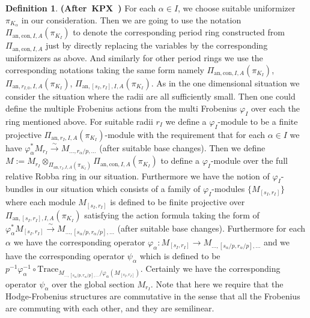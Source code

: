 \documentclass[12pt]{amsart}
\theoremstyle{definition}
\newtheorem{definition}[theorem]{Definition}
\numberwithin{equation}{section}
\begin{document}
\begin{definition} \mbox{\bf{(After KPX \cite[Definition 2.2.2]{KPX})}}
For each $\alpha\in I$, we choose suitable uniformizer $\pi_{K_\alpha}$ in our consideration. Then we are going to use the notation $\Pi_{\mathrm{an},\mathrm{con},I,A}(\pi_{K_I})$ to denote the corresponding period ring constructed from $\Pi_{\mathrm{an},\mathrm{con},I,A}$ just by directly replacing the variables by the corresponding uniformizers as above. And similarly for other period rings we use the corresponding notations taking the same form namely $\Pi_{\mathrm{an},\mathrm{con},I,A}(\pi_{K_I})$, $\Pi_{\mathrm{an},r_{I,0},I,A}(\pi_{K_I})$, $\Pi_{\mathrm{an},[s_I,r_I],I,A}(\pi_{K_I})$. As in the one dimensional situation we consider the situation where the radii are all sufficiently small. Then one could define the multiple Frobenius actions from the multi Frobenius $\varphi_I$ over each the ring mentioned above. For suitable radii $r_I$ we define a $\varphi_I$-module to be a finite projective $\Pi_{\mathrm{an},r_{I},I,A}(\pi_{K_I})$-module with the requirement that for each $\alpha\in I$ we have $\varphi_\alpha^*M_{r_I}\overset{\sim}{\rightarrow}M_{...,r_\alpha/p,...}$ (after suitable base changes). Then we define $M:=M_{r_I}\otimes_{\Pi_{\mathrm{an},r_{I},I,A}(\pi_{K_I})}\Pi_{\mathrm{an},\mathrm{con},I,A}(\pi_{K_I})$ to define a $\varphi_I$-module over the full relative Robba ring in our situation. Furthermore we have the notion of $\varphi_I$-bundles in our situation which consists of a family of $\varphi_I$-modules $\{M_{[s_I,r_I]}\}$ where each module $M_{[s_I,r_I]}$ is defined to be finite projective over $\Pi_{\mathrm{an},[s_I,r_I],I,A}(\pi_{K_I})$ satisfying the action formula taking the form of $\varphi_\alpha^*M_{[s_I,r_I]}\overset{\sim}{\rightarrow}M_{...,[s_\alpha/p,r_\alpha/p],...}$ (after suitable base changes). Furthermore for each $\alpha$ we have the corresponding operator $\varphi_\alpha:M_{[s_I,r_I]}\rightarrow M_{...,[s_\alpha/p,r_\alpha/p],...}$ and we have the corresponding operator $\psi_\alpha$ which is defined to be $p^{-1}\varphi_\alpha^{-1}\circ\mathrm{Trace}_{M_{...,[s_\alpha/p,r_\alpha/p],...}/\varphi_\alpha(M_{[s_I,r_I]})}$. Certainly we have the corresponding operator $\psi_\alpha$ over the global section $M_{r_I}$. Note that here we require that the Hodge-Frobenius structures are commutative in the sense that all the Frobenius are commuting with each other, and they are semilinear.
\end{definition}
\end{document}
